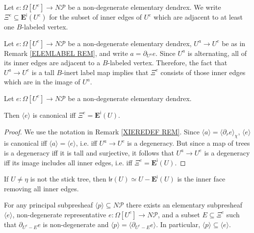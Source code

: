 \documentclass[a4paper,10pt
,draft
]{article}%
\renewcommand{\1}{\eta}%
\begin{document}
\begin{definition}\label{XIEDGES DEF}
Let $e \colon \Omega[U^e] \to N \mathcal{P}$ be a non-degenerate elementary dendrex.
We write
$\Xi^e \subseteq \boldsymbol{E}^{\mathsf{i}}(U^e)$
for the subset of inner edges of $U^e$ which are adjacent to at least one $B$-labeled vertex.
\end{definition}




\begin{remark}\label{XIEREDEF REM}
Let $e \colon \Omega[U^e] \to N \mathcal{P}$ be a non-degenerate elementary dendrex, 
$U^a \to U^e$ be as in Remark \ref{ELEMLABEL REM}, 
and write $a = \partial_{U^a} e$.
Since $U^a$ is alternating, all of its inner edges are adjacent to a 
$B$-labeled vertex. 
Therefore, the fact that $U^a \to U^e$ is a tall $B$-inert label map
implies that $\Xi^e$ consists of those inner edges which are in the image of $U^a$.
\end{remark}



\begin{proposition}\label{CANIFFXIE PROP}
Let $e \colon \Omega[U^e] \to N \mathcal{P}$ be a non-degenerate elementary dendrex.

Then $\langle e \rangle$
is canonical iff $\Xi^e = \boldsymbol{E}^{\mathsf{i}}(U)$.
\end{proposition}

\begin{proof}
We use the notation in Remark \ref{XIEREDEF REM}.
Since $\langle a\rangle = \langle \partial_r e \rangle_{\chi}$, 
$\langle e \rangle$
is canonical 
iff
 $\langle a\rangle = \langle e \rangle$, i.e.
iff
$U^a \to U^e$ is a degeneracy. 
But since a map of trees is a degeneracy iff it is tall and surjective,
it follows that $U^a \to U^e$ is a degeneracy
iff its image includes all inner edges, i.e. iff $\Xi^e = \boldsymbol{E}^{\mathsf{i}}(U)$.
\end{proof}



\begin{remark}\label{WHENLRINN REM}
If $U\neq \eta$ is not the stick tree,
then $\mathsf{lr}(U) \simeq U - \boldsymbol{E}^{\mathsf{i}}(U)$
is the inner face removing all inner edges.
\end{remark}



\begin{lemma}\label{ELEMEXIST LEM}
For any principal subpresheaf $\langle p \rangle \subseteq N \mathcal{P}$
there exists an elementary subpresheaf
$\langle e \rangle$, 
non-degenerate representative 
$e \colon \Omega[U^e] \to N \mathcal{P}$,
and a subset $E \subseteq \Xi^{e}$
such that
 $\partial_{U^e-E} e$ is non-degenerate and 
$\langle p \rangle = \langle \partial_{U^e-E} e \rangle$.
In particular,  
$\langle p \rangle \subseteq \langle e \rangle$.
\end{lemma}
\end{document}
